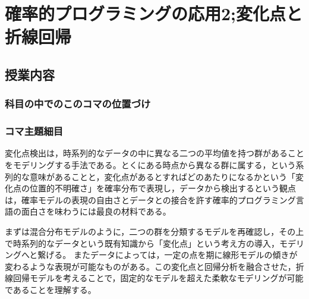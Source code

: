 \section{確率的プログラミングの応用2;変化点と折線回帰}
\subsection{授業内容}
\subsubsection{科目の中でのこのコマの位置づけ}
\subsubsection{コマ主題細目}
変化点検出は，時系列的なデータの中に異なる二つの平均値を持つ群があることをモデリングする手法である。とくにある時点から異なる群に属する，という系列的な意味があることと，変化点があるとすればどのあたりになるかという「変化点の位置的不明確さ」を確率分布で表現し，データから検出するという観点は，確率モデルの表現の自由さとデータとの接合を許す確率的プログラミング言語の面白さを味わうには最良の材料である。

まずは混合分布モデルのように，二つの群を分類するモデルを再確認し，その上で時系列的なデータという既有知識から「変化点」という考え方の導入，モデリングへと繋げる。
またデータによっては，一定の点を期に線形モデルの傾きが変わるような表現が可能なものがある。この変化点と回帰分析を融合させた，折線回帰モデルを考えることで，固定的なモデルを超えた柔軟なモデリングが可能であることを理解する。

